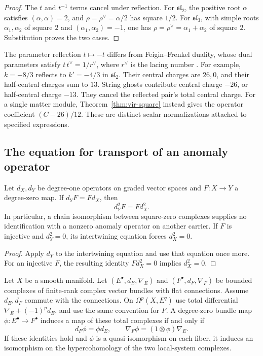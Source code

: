 \begin{proof}
The $t$ and $t^{-1}$ terms cancel under reflection.
For $\mathfrak{sl}_2$, the positive root $\alpha$ satisfies $(\alpha,\alpha)=2$, and $\rho=\rho^\vee=\alpha/2$ has square $1/2$.
For $\mathfrak{sl}_3$, with simple roots $\alpha_1,\alpha_2$ of square $2$ and $(\alpha_1,\alpha_2)=-1$, one has $\rho=\rho^\vee=\alpha_1+\alpha_2$ of square $2$.
Substitution proves the two cases.
\end{proof}

The parameter reflection $t\mapsto-t$ differs from Feigin--Frenkel duality, whose dual parameters satisfy $t\,t^{\vee}=1/r^\vee$, where $r^\vee$ is the lacing number \cite[p.~566, footnote~1]{Ara15}.
For example, $k=-8/3$ reflects to $k'=-4/3$ in $\mathfrak{sl}_2$.
Their central charges are $26,0$, and their half-central charges sum to $13$.
String ghosts contribute central charge $-26$, or half-central charge $-13$.
They cancel the reflected pair's total central charge.
For a single matter module, Theorem~\ref{thm:vir-square} instead gives the operator coefficient $(C-26)/12$.
These are distinct scalar normalizations attached to specified expressions.

\subsection{The equation for transport of an anomaly operator}

\begin{proposition}
\label{prop:cbc26-square-transport}
Let $d_X,d_Y$ be degree-one operators on graded vector spaces and $F:X\to Y$ a degree-zero map.
If $d_YF=Fd_X$, then
\[
 d_Y^2F=Fd_X^2.
\]
In particular, a chain isomorphism between square-zero complexes supplies no identification with a nonzero anomaly operator on another carrier.
If $F$ is injective and $d_Y^2=0$, its intertwining equation forces $d_X^2=0$.
\end{proposition}

\begin{proof}
Apply $d_Y$ to the intertwining equation and use that equation once more.
For an injective $F$, the resulting identity $Fd_X^2=0$ implies $d_X^2=0$.
\end{proof}

\begin{proposition}
\label{prop:cbc26-horizontal-comparison}
Let $X$ be a smooth manifold.
Let $(E^\bullet,d_E,\nabla_E)$ and $(F^\bullet,d_F,\nabla_F)$ be bounded complexes of finite-rank complex vector bundles with flat connections.
Assume $d_E,d_F$ commute with the connections.
On $\Omega^p(X,E^q)$ use total differential $\nabla_E+(-1)^p d_E$, and use the same convention for $F$.
A degree-zero bundle map $\phi:E^\bullet\to F^\bullet$ induces a map of these total complexes if and only if
\[
 d_F\phi=\phi d_E,\qquad
 \nabla_F\phi=(1\otimes\phi)\nabla_E.
\]
If these identities hold and $\phi$ is a quasi-isomorphism on each fiber, it induces an isomorphism on the hypercohomology of the two local-system complexes.
\end{proposition}

